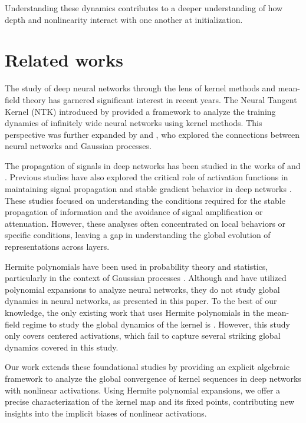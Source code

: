 \documentclass[twoside]{article}
\theoremstyle{definition}
\begin{document}
Understanding these dynamics contributes to a deeper understanding of how depth and nonlinearity interact with one another at initialization. 


\section{Related works}
The study of deep neural networks through the lens of kernel methods and mean-field theory has garnered significant interest in recent years. The Neural Tangent Kernel (NTK) introduced by \citet{jacot2018neural} provided a framework to analyze the training dynamics of infinitely wide neural networks using kernel methods. This perspective was further expanded by \citet{lee2019wide} and \citet{arora2019exact}, who explored the connections between neural networks and Gaussian processes.

The propagation of signals in deep networks has been studied in the works of \citet{schoenholz2016deep} and \citet{pennington2017resurrecting}. Previous studies have also explored the critical role of activation functions in maintaining signal propagation and stable gradient behavior in deep networks \citep{hayou2019impact}. These studies focused on understanding the conditions required for the stable propagation of information and the avoidance of signal amplification or attenuation. However, these analyses often concentrated on local behaviors or specific conditions, leaving a gap in understanding the global evolution of representations across layers. 

Hermite polynomials have been used in probability theory and statistics, particularly in the context of Gaussian processes \citep{williams2006gaussian}. Although \citet{poole2016exponential} and \citet{daniely2016toward} have utilized polynomial expansions to analyze neural networks, they do not study global dynamics in neural networks, as presented in this paper. To the best of our knowledge, the only existing work that uses Hermite polynomials in the mean-field regime to study the global dynamics of the kernel is \citet{joudaki2023impact}. However, this study only covers centered activations, which fail to capture several striking global dynamics covered in this study.

Our work extends these foundational studies by providing an explicit algebraic framework to analyze the global convergence of kernel sequences in deep networks with nonlinear activations. Using Hermite polynomial expansions, we offer a precise characterization of the kernel map and its fixed points, contributing new insights into the implicit biases of nonlinear activations.
\end{document}

